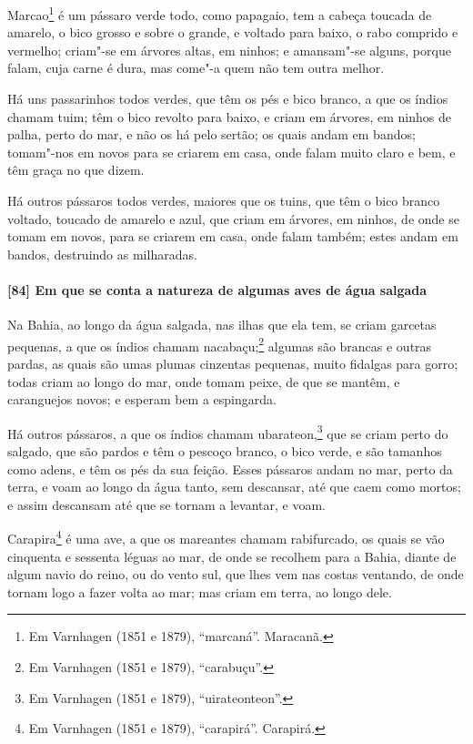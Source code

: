 Marcao\footnote{ Em Varnhagen (1851 e 1879), ``marcaná''. Maracanã.} é um pássaro verde
todo, como papagaio, tem a cabeça toucada de amarelo, o bico grosso e sobre o grande, e
voltado para baixo, o rabo comprido e vermelho; criam"-se em árvores altas, em ninhos; e
amansam"-se alguns, porque falam, cuja carne é dura, mas come"-a quem não tem outra melhor.

Há uns passarinhos todos verdes, que têm os pés e bico branco, a que os índios chamam
tuim; têm o bico revolto para baixo, e criam em árvores, em ninhos de palha, perto do mar,
e não os há pelo sertão; os quais andam em bandos; tomam"-nos em novos para se criarem em
casa, onde falam muito claro e bem, e têm graça no que dizem.

Há outros pássaros todos verdes, maiores que os tuins, que têm o bico branco voltado,
toucado de amarelo e azul, que criam em árvores, em ninhos, de onde se tomam em novos,
para se criarem em casa, onde falam também; estes andam em bandos, destruindo as
milharadas.

\paragraph{[84] Em que se conta a natureza de algumas aves de água salgada}\quad
Na Bahia, ao longo da água salgada, nas ilhas que ela tem, se criam garcetas pequenas, a
que os índios chamam nacabaçu;\footnote{ Em Varnhagen (1851 e 1879), ``carabuçu''.}
algumas são brancas e outras pardas, as quais são umas plumas cinzentas pequenas, muito
fidalgas para gorro; todas criam ao longo do mar, onde tomam peixe, de que se mantêm, e
caranguejos novos; e esperam bem a espingarda.

Há outros pássaros, a que os índios chamam ubarateon,\footnote{ Em Varnhagen (1851 e 1879),
``uirateonteon''.} que se criam perto do salgado, que são pardos e têm o pescoço branco,
o bico verde, e são tamanhos como adens, e têm os pés da sua feição. Esses pássaros andam
no mar, perto da terra, e voam ao longo da água tanto, sem descansar, até que caem como
mortos; e assim descansam até que se tornam a levantar, e voam.

Carapira\footnote{ Em Varnhagen (1851 e 1879), ``carapirá''. Carapirá.} é uma ave, a que
os mareantes chamam rabifurcado, os quais se vão cinquenta e sessenta léguas ao mar, de
onde se recolhem para a Bahia, diante de algum navio do reino, ou do vento sul, que lhes
vem nas costas ventando, de onde tornam logo a fazer volta ao mar; mas criam em terra, ao
longo dele.

